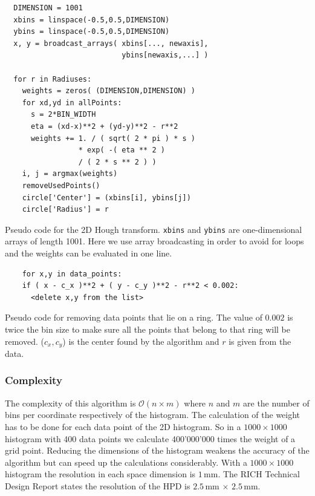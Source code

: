 \documentclass[11pt]{scrreprt}
\begin{document}
\begin{codesnippet}[htb]
\begin{lstlisting}
  DIMENSION = 1001
  xbins = linspace(-0.5,0.5,DIMENSION)
  ybins = linspace(-0.5,0.5,DIMENSION)
  x, y = broadcast_arrays( xbins[..., newaxis], 
                           ybins[newaxis,...] )

  for r in Radiuses:
    weights = zeros( (DIMENSION,DIMENSION) )
    for xd,yd in allPoints:
      s = 2*BIN_WIDTH
      eta = (xd-x)**2 + (yd-y)**2 - r**2      
      weights += 1. / ( sqrt( 2 * pi ) * s ) 
                 * exp( -( eta ** 2 ) 
                 / ( 2 * s ** 2 ) )
    i, j = argmax(weights)
    removeUsedPoints()
    circle['Center'] = (xbins[i], ybins[j])
    circle['Radius'] = r
\end{lstlisting}
  \caption[Pseudo code 2D HT]{Pseudo code for the 2D Hough transform. \texttt{xbins} and \texttt{ybins} are one-dimensional arrays of length 1001. Here we use array 
  broadcasting in order to avoid for loops and the weights can be evaluated in one line.}
\end{codesnippet}


\begin{codesnippet}
\begin{lstlisting}
    for x,y in data_points:
    if ( x - c_x )**2 + ( y - c_y )**2 - r**2 < 0.002:
      <delete x,y from the list>
\end{lstlisting}
\caption[Removing data points that lie on a ring]{Pseudo code for removing data points that lie on a ring. The value of $0.002$ is twice the bin size to make sure all the points that
belong to that ring will be removed. ($c_x, c_y$) is the center found by the algorithm and $r$ is given from the data.}\label{lst:remove_points}
\end{codesnippet}

\subsubsection{Complexity} %
\label{ssub:complexity_2d}
The complexity of this algorithm is $\mathcal{O}(n\times m)$ where $n$ and $m$ are the number of bins per coordinate respectively of 
the histogram. The calculation of the weight has to be done for each data point of the 2D histogram. So in a $1000\times 1000$ histogram 
with 400 data points we calculate 400'000'000 times the weight of a grid point. Reducing the dimensions of the histogram weakens the 
accuracy of the algorithm but can speed up the calculations considerably. With a $1000\times 1000$ histogram the resolution in each 
space dimension is $1$\,mm. The RICH Technical Design Report states the resolution of the HPD is $2.5$\,mm $\times$ $2.5$\,mm.
\end{document}
